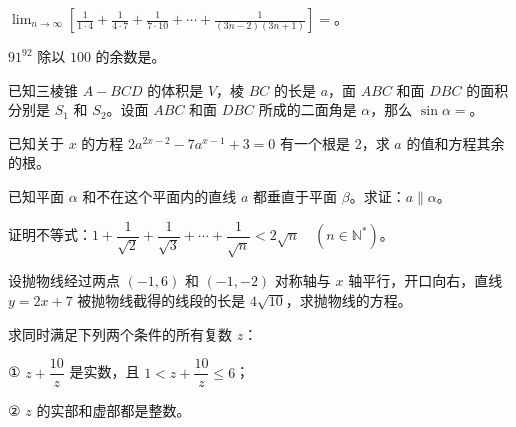 \begin{question}
$\displaystyle\lim_{n\to\infty}\left[\frac1{1\cdot4}+\frac1{4\cdot7}+\frac1{7\cdot10}+\cdots+\frac1{(3n-2)(3n+1)}\right]=$\underline{\qquad\qquad}。

\end{question}
\begin{question}
$91^{92}$ 除以 $100$ 的余数是\underline{\qquad\qquad}。

\end{question}
\begin{question}
已知三棱锥 $A-BCD$ 的体积是 $V$，棱 $BC$ 的长是 $a$，面 $ABC$ 和面 $DBC$ 的面积分别是 $S_1$ 和 $S_2$。设面 $ABC$ 和面 $DBC$ 所成的二面角是 $\alpha$，那么 $\sin\alpha=$\underline{\qquad\qquad}。

\end{question}
\begin{question}
已知关于 $x$ 的方程 $2a^{2x-2}-7a^{x-1}+3=0$ 有一个根是 $2$，求 $a$ 的值和方程其余的根。

\end{question}
\begin{question}
已知平面 $\alpha$ 和不在这个平面内的直线 $a$ 都垂直于平面 $\beta$。求证：$a\parallel\alpha$。

\end{question}
\begin{question}
证明不等式：$1+\dfrac1{\sqrt2}+\dfrac1{\sqrt3}+\cdots+\dfrac1{\sqrt n}<2\sqrt n\quad(n\in\mathbb N^*)$。

\end{question}
\begin{question}
设抛物线经过两点 $(-1,6)$ 和 $(-1,-2)$ 对称轴与 $x$ 轴平行，开口向右，直线 $y=2x+7$ 被抛物线截得的线段的长是 $4\sqrt{10}$，求抛物线的方程。

\end{question}
\begin{question}
求同时满足下列两个条件的所有复数 $z$：

① $z+\dfrac{10}{z}$ 是实数，且 $1<z+\dfrac{10}{z}\le6$；

② $z$ 的实部和虚部都是整数。

\end{question}